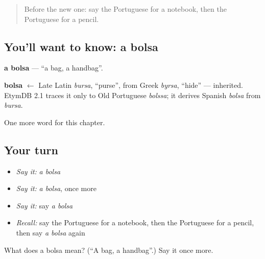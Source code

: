 \begin{quote}
Before the new one: say the Portuguese for a notebook, then the Portuguese for a pencil.
\end{quote}

\subsection*{You'll want to know: a bolsa}
\textbf{a bolsa} — \textquotedblleft{}a bag, a handbag\textquotedblright{}.

\begin{cousinweb}
\textbf{bolsa} $\leftarrow$ Late Latin \emph{bursa}, \textquotedblleft{}purse\textquotedblright{}, from Greek \emph{byrsa}, \textquotedblleft{}hide\textquotedblright{} — inherited. EtymDB 2.1 traces it only to Old Portuguese \emph{bolssa}; it derives Spanish \emph{bolsa} from \emph{bursa}.
\end{cousinweb}

\begin{grammarlens}[title={What you've built}]
One more word for this chapter.
\end{grammarlens}

\subsection*{Your turn}
\begin{itemize}
\raggedright
  \item \emph{Say it:} \emph{a bolsa}
  \item \emph{Say it:} \emph{a bolsa}, once more
  \item \emph{Say it:} say \emph{a bolsa}
  \item \emph{Recall:} say the Portuguese for a notebook, then the Portuguese for a pencil, then say \emph{a bolsa} again
\end{itemize}

\begin{tcolorbox}[breakable,colback=teal!4,colframe=teal!35!black,title={Before you move on}]
What does a bolsa mean? (\textquotedblleft{}A bag, a handbag\textquotedblright{}.) Say it once more.
\end{tcolorbox}
